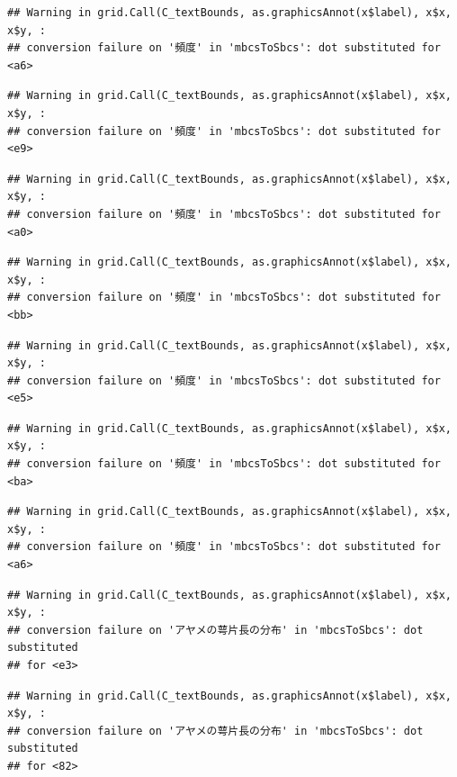 \documentclass[
]{book}
\begin{document}
\begin{verbatim}
## Warning in grid.Call(C_textBounds, as.graphicsAnnot(x$label), x$x, x$y, :
## conversion failure on '頻度' in 'mbcsToSbcs': dot substituted for <a6>
\end{verbatim}

\begin{verbatim}
## Warning in grid.Call(C_textBounds, as.graphicsAnnot(x$label), x$x, x$y, :
## conversion failure on '頻度' in 'mbcsToSbcs': dot substituted for <e9>
\end{verbatim}

\begin{verbatim}
## Warning in grid.Call(C_textBounds, as.graphicsAnnot(x$label), x$x, x$y, :
## conversion failure on '頻度' in 'mbcsToSbcs': dot substituted for <a0>
\end{verbatim}

\begin{verbatim}
## Warning in grid.Call(C_textBounds, as.graphicsAnnot(x$label), x$x, x$y, :
## conversion failure on '頻度' in 'mbcsToSbcs': dot substituted for <bb>
\end{verbatim}

\begin{verbatim}
## Warning in grid.Call(C_textBounds, as.graphicsAnnot(x$label), x$x, x$y, :
## conversion failure on '頻度' in 'mbcsToSbcs': dot substituted for <e5>
\end{verbatim}

\begin{verbatim}
## Warning in grid.Call(C_textBounds, as.graphicsAnnot(x$label), x$x, x$y, :
## conversion failure on '頻度' in 'mbcsToSbcs': dot substituted for <ba>
\end{verbatim}

\begin{verbatim}
## Warning in grid.Call(C_textBounds, as.graphicsAnnot(x$label), x$x, x$y, :
## conversion failure on '頻度' in 'mbcsToSbcs': dot substituted for <a6>
\end{verbatim}

\begin{verbatim}
## Warning in grid.Call(C_textBounds, as.graphicsAnnot(x$label), x$x, x$y, :
## conversion failure on 'アヤメの萼片長の分布' in 'mbcsToSbcs': dot substituted
## for <e3>
\end{verbatim}

\begin{verbatim}
## Warning in grid.Call(C_textBounds, as.graphicsAnnot(x$label), x$x, x$y, :
## conversion failure on 'アヤメの萼片長の分布' in 'mbcsToSbcs': dot substituted
## for <82>
\end{verbatim}
\end{document}

